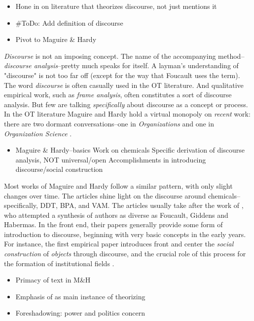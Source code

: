 
\begin{itemize}
	\item Hone in on literature that theorizes discourse, not just mentions it
	\item \#ToDo: Add definition of discourse
	\item Pivot to Maguire \& Hardy
\end{itemize}

\textit{Discourse} is not an imposing concept. The name of the accompanying method--\textit{discourse analysis}--pretty much speaks for itself. A layman's understanding of "discourse" is not too far off (except for the way that Foucault uses the term). The word \textit{discourse} is often casually used in the OT literature. And qualitative empirical work, such as \textit{frame analysis}, often constitutes a sort of discourse analysis. But few are talking \textit{specifically} about discourse as a concept or process. In the OT literature Maguire and Hardy hold a virtual monopoly on \textit{recent} work: there are two dormant conversations--one in \textit{Organizations} \citep[e.g.,][]{Burrell2000} and one in \textit{Organization Science} \citep[e.g.,][]{Grant2004}.

\begin{itemize}
	\item Maguire \& Hardy--basics
		\subitem Work on chemicals
		\subitem Specific derivation of discourse analysis, NOT universal/open
		\subitem Accomplishments in introducing discourse/social construction
\end{itemize}

Most works of Maguire and Hardy follow a similar pattern, with only slight changes over time. The articles shine light on the discourse around chemicals--specifically, DDT, BPA, and VAM. The articles usually take after the work of \citep{Fairclough1992}, who attempted a synthesis of authors as diverse as Foucault, Giddens and Habermas. In the front end, their papers generally provide some form of introduction to discourse, beginning with very basic concepts in the early years. For instance, the first empirical paper introduces front and center the \textit{social construction} of \textit{objects} through discourse, and the crucial role of this process for the formation of institutional fields \citep{Hardy1999}.

\begin{itemize}
	\item Primacy of text in M\&H
	\item Emphasis of \citet{Phillips2004} as main instance of theorizing
	\item Foreshadowing: power and politics concern
\end{itemize}

